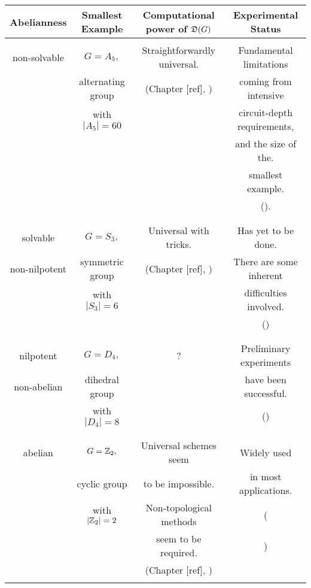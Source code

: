 \begin{center}
\begin{tabular}{|| c | c | c | c ||} 

\hline
Abelianness & Smallest Example& Computational power of $\mathfrak{D}(G)$& Experimental Status \\ [0.5ex] 
 \hline\hline
  &  & &\\ 
 non-solvable & $G=A_5,$ & Straightforwardly universal.& Fundamental limitations\\
  & alternating group & (Chapter [ref], \cite{mochon2003anyons})& coming from intensive\\ 
  & with $|A_5|=60$ & & circuit-depth requirements,\\ 
  &  & & and the size of the.\\ 
  &  & & smallest example.\\ 
  &  & & (\cite{bravyi2022adaptive}).\\ 
  &  & &\\ 
 \hline
  &  & &\\ 
 solvable& $G=S_3,$ & Universal with tricks. & Has yet to be done.\\
 non-nilpotent& symmetric group& (Chapter [ref], \cite{mochon2004anyon}) & There are some inherent \\ 
 & with $|S_3|=6$ & & difficulties involved.\\ 
  &  & & (\cite{tantivasadakarn2023hierarchy})\\ 
  &  & &\\ 
 \hline  &  & &\\ 
 nilpotent& $G=D_4,$ & ? & Preliminary experiments \\
 non-abelian& dihedral group & & have been successful.  \\ 
 & with $|D_4|=8$ & & (\cite{iqbal2024non})   \\ 
  &  & &\\ 
 \hline
  &  & &\\ 
 abelian & $G=\mathbb{Z}_2,$ & Universal schemes seem& Widely used\\ 
  & cyclic group & to be impossible.& in most applications. \\ 
  &with $|\mathbb{Z}_2|=2$ &  Non-topological methods& (\cite{bravyi2024high, hong2024entangling}\\ 
  &  & seem to be required.& \cite{balewski2024engineering, google2023suppressing})\\ 
  &  & (Chapter [ref], \cite{bravyi2013classification, eastin2009restrictions}) &\\ 
  &  & &\\ 
 \hline
\end{tabular}
\end{center}

